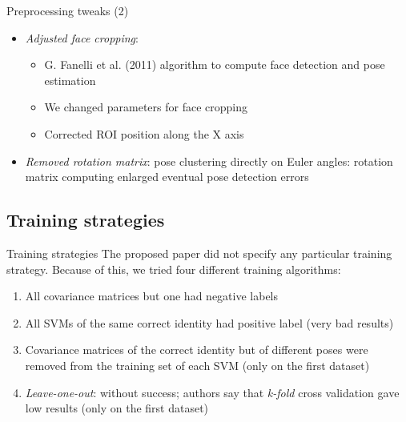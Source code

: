 \documentclass[unknownkeysallowed]{beamer}
\begin{document}
\begin{frame}{Preprocessing tweaks (2)}
	\begin{itemize}
		\item \textit{Adjusted face cropping}:
			\begin{itemize}
				\item G. Fanelli et al. (2011) algorithm to
					compute face detection and pose
					estimation
				\item We changed parameters for face cropping
				\item Corrected ROI position along the X
					axis
			\end{itemize}
		\item \textit{Removed rotation matrix}: pose clustering
			directly on Euler angles: rotation matrix computing
			enlarged eventual pose detection errors
	\end{itemize}
\end{frame}

\subsection{Training strategies}
\begin{frame}{Training strategies}
	The proposed paper did not specify any particular training strategy.
	Because of this, we tried four different training algorithms:
	\begin{enumerate}
		\item All covariance matrices but
			one had negative labels
		\item All SVMs of the same correct identity
			had positive label (very bad results)
		\item Covariance matrices of the correct identity but of
			different poses were removed from the training set of
			each SVM (only on the first dataset)
		\item \textit{Leave-one-out}: without
			success; authors say that \textit{k-fold} cross
			validation gave low results (only on the first dataset)
	\end{enumerate}
\end{frame}
\end{document}
